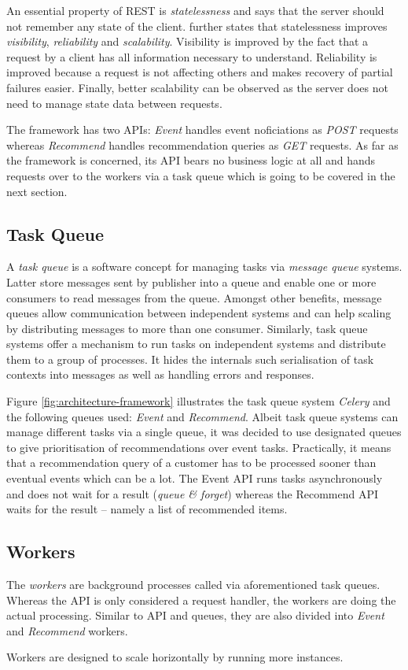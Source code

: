 An essential property of REST is \emph{statelessness} and says that the server should not remember any state of the client. \citet{fielding00} further states that statelessness improves \emph{visibility}, \emph{reliability} and \emph{scalability}. Visibility is improved by the fact that a  request by a client has all information necessary to understand. Reliability is improved because a request is not affecting others and makes recovery of partial failures easier. Finally, better scalability can be observed as the server does not need to manage state data between requests.

The framework has two APIs: \emph{Event} handles event noficiations as \emph{POST} requests whereas \emph{Recommend} handles recommendation queries as \emph{GET} requests. As far as the framework is concerned, its API bears no business logic at all and hands requests over to the workers via a task queue which is going to be covered in the next section.

\subsection{Task Queue}

A \emph{task queue} is a software concept for managing tasks via \emph{message queue} systems. Latter store messages sent by publisher into a queue and enable one or more consumers to read messages from the queue. Amongst other benefits, message queues allow communication between independent systems and can help scaling by distributing messages to more than one consumer. Similarly, task queue systems offer a mechanism to run tasks on independent systems and distribute them to a group of processes. It hides the internals such serialisation of task contexts into messages as well as handling errors and responses.

Figure \ref{fig:architecture-framework} illustrates the task queue system \emph{Celery} and the following queues used: \emph{Event} and \emph{Recommend}. Albeit task queue systems can manage different tasks via a single queue, it was decided to use designated queues to give prioritisation of recommendations over event tasks. Practically, it means that a recommendation query of a customer has to be processed sooner than eventual events which can be a lot. The Event API runs tasks asynchronously and does not wait for a result (\emph{queue \& forget}) whereas the Recommend API waits for the result -- namely a list of recommended items.

\subsection{Workers}

The \emph{workers} are background processes called via aforementioned task queues. Whereas the API is only considered a request handler, the workers are doing the actual processing. Similar to API and queues, they are also divided into \emph{Event} and \emph{Recommend} workers.

Workers are designed to scale horizontally by running more instances.
